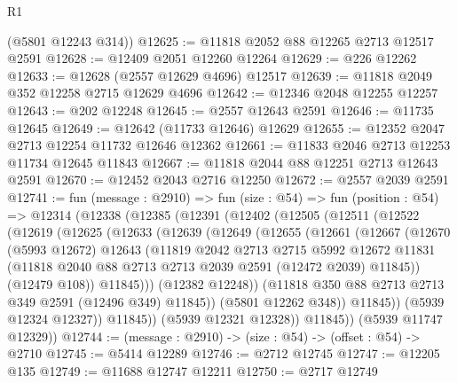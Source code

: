\begin{lexlean}{R1}
\begin{coremodule}
      (@5801 @12243 @314))
@12625 := @11818 @2052 @88 @12265 @2713 @12517 @2591
@12628 := @12409 @2051 @12260 @12264
@12629 := @226 @12262
@12633 := @12628 (@2557 @12629 @4696) @12517
@12639 := @11818 @2049 @352 @12258 @2715 @12629 @4696
@12642 := @12346 @2048 @12255 @12257
@12643 := @202 @12248
@12645 := @2557 @12643 @2591
@12646 := @11735 @12645
@12649 := @12642 (@11733 @12646) @12629
@12655 := @12352 @2047 @2713 @12254 @11732 @12646 @12362
@12661 := @11833 @2046 @2713 @12253 @11734 @12645 @11843
@12667 := @11818 @2044 @88 @12251 @2713 @12643 @2591
@12670 := @12452 @2043 @2716 @12250
@12672 := @2557 @2039 @2591
@12741 := fun (message : @2910) =>
  fun (size : @54) =>
  fun (position : @54) =>
  @12314
    (@12338
      (@12385
        (@12391
          (@12402
            (@12505
              (@12511
                (@12522
                  (@12619
                    (@12625
                      (@12633
                        (@12639
                          (@12649
                            (@12655
                              (@12661
                                (@12667
                                  (@12670
                                    (@5993 @12672)
                                    @12643
                                    (@11819
                                      @2042
                                      @2713
                                      @2715
                                      @5992
                                      @12672
                                      @11831
                                      (@11818
                                        @2040
                                        @88
                                        @2713
                                        @2713
                                        @2039
                                        @2591
                                        (@12472 @2039)
                                        @11845))
                                    (@12479 @108))
                                  @11845)))
                            (@12382 @12248))
                          (@11818 @350 @88 @2713 @2713 @349 @2591 (@12496 @349) @11845))
                        (@5801 @12262 @348))
                      @11845))
                  (@5939 @12324 @12327))
                @11845))
            (@5939 @12321 @12328))
          @11845))
      (@5939 @11747 @12329))
@12744 := (message : @2910) -> (size : @54) -> (offset : @54) -> @2710
@12745 := @5414 @12289
@12746 := @2712 @12745
@12747 := @12205 @135
@12749 := @11688 @12747 @12211
@12750 := @2717 @12749

\end{coremodule}
\end{lexlean}

